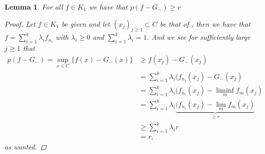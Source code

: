 \documentclass[10pt,twoside,openany,final]{memoir}
\theoremstyle{break}
\newtheorem{lemma}[section]{Lemma}
\theoremstyle{Break}
\begin{document}
\begin{lemma}\label{pryce 3}
For all $f \in K_{1}$ we have that $p(f-G_{-}) \geq r$
\begin{proof}
Let $f \in K_{1}$ be given and let $(x_{j})_{j \geq 1} \subset C$ be that of , then we have that $f=\sum_{i=1}^k \lambda_{i} f_{n_{i}}$ with $\lambda_{i} \geq 0$ and $\sum_{i=1}^k \lambda_{i}= 1$. And we see for sufficiently large $j \geq 1$ that
\begin{align*}
p(f-G_{-})=\sup_{x \in C} \{f(x)-G_{-}(x) \}&\geq f(x_{j})-G_{-}(x_{j})\\
&=\sum_{i=1}^k \lambda_{i} (f_{n_{i}}(x_{j}) - G_{-}(x_{j}) \\
&=\sum_{i=1}^k \lambda_{i} (f_{n_{i}}(x_{j}) - \liminf_{m}f_{m}(x_{j})\\
&=\sum_{i=1}^k \lambda_{i} \underbrace{(f_{n_{i}}(x_{j}) - \lim_{m}f_{m}(x_{j})}_{\geq r}\\
&\geq \sum_{i=1}^k \lambda_{i} r\\
&=r,
\end{align*}
as wanted. 
\end{proof}
\end{lemma}
\end{document}
